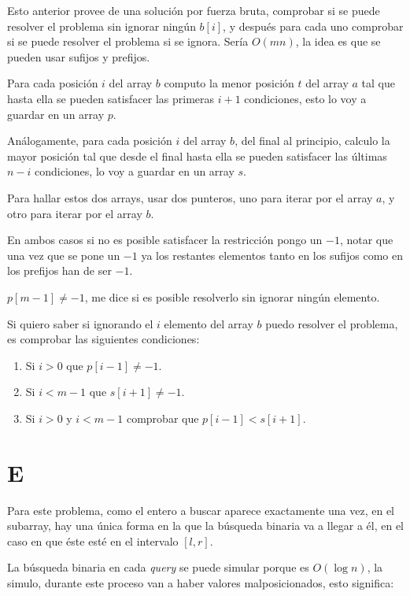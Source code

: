 \documentclass[14pt]{extarticle}
\begin{document}
Esto anterior provee de una solución por fuerza bruta, comprobar si se puede resolver el problema sin ignorar ningún $b[i]$, y después para cada uno comprobar si se puede resolver el problema si se ignora. Sería $O(mn)$, la idea es que se pueden usar sufijos y prefijos. 

Para cada posición $i$ del array $b$ computo la menor posición $t$ del array $a$ tal que hasta ella se pueden satisfacer las primeras $i+1$ condiciones, esto lo voy a guardar en un array $p$.

Análogamente, para cada posición $i$ del array $b$, del final al principio, calculo la mayor posición tal que desde el final hasta ella se pueden satisfacer las últimas $n - i$ condiciones, lo voy a guardar en un array $s$.

Para hallar estos dos arrays, usar dos punteros, uno para iterar por el array $a$, y otro para iterar por el array $b$.

En ambos casos si no es posible satisfacer la restricción pongo un $-1$, notar que una vez que se pone un $-1$ ya los restantes elementos tanto en los sufijos como en los prefijos han de ser $-1$.

$p[m-1] \neq -1$, me dice si es posible resolverlo sin ignorar ningún elemento.

Si quiero saber si ignorando el $i$ elemento del array $b$ puedo resolver el problema, es comprobar las siguientes condiciones:

\begin{enumerate}
    \item Si $i > 0$ que $p[i-1] \neq -1$.
    \item Si $i < m-1$ que $s[i+1] \neq -1$.
    \item Si $i > 0$ y $i < m-1$ comprobar que $p[i-1] < s[i+1]$.
\end{enumerate}

\section{E}

Para este problema, como el entero a buscar aparece exactamente una vez, en el subarray, hay una única forma en la que la búsqueda binaria va a llegar a él, en el caso en que éste esté en el intervalo $[l, r]$.

La búsqueda binaria en cada \textit{query} se puede simular porque es $O(\log n)$, la simulo, durante este proceso van a haber valores malposicionados, esto significa:
\end{document}
